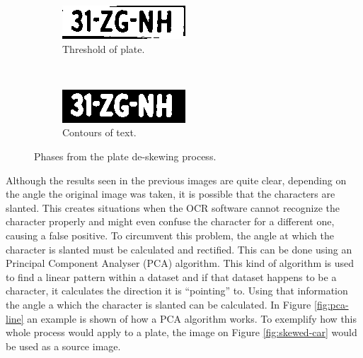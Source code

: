 \begin{figure}[ht]
        \begin{subfigure}{0.33\textwidth}
            \includegraphics[width=\textwidth]{plaatjes/remove-border-plate}
            \caption{Threshold of plate.}
            \label{fig:threshold-plate}
        \end{subfigure}%
        ~
        \begin{subfigure}{0.33\textwidth}
            \includegraphics[width=\textwidth]{plaatjes/contour-text}
            \caption{Contours of text.}
            \label{fig:contour-text}
        \end{subfigure}%

        \caption{Phases from the plate de-skewing process.}
        \label{fig:deskewing-plate}
\end{figure}

Although the results seen in the previous images are quite clear, depending on the angle the original image was taken, it is possible that the characters are slanted. This creates situations when the OCR software cannot recognize the character properly and might even confuse the character for a different one, causing a false positive. To circumvent this problem, the angle at which the character is slanted must be calculated and rectified. This can be done using an Principal Component Analyser (PCA) algorithm. This kind of algorithm is used to find a linear pattern within a dataset and if that dataset happens to be a character, it calculates the direction it is ``pointing'' to. Using that information the angle a which the character is slanted can be calculated. In Figure \ref{fig:pca-line} an example is shown of how a PCA algorithm works. To exemplify how this whole process would apply to a plate, the image on Figure \ref{fig:skewed-car} would be used as a source image.

